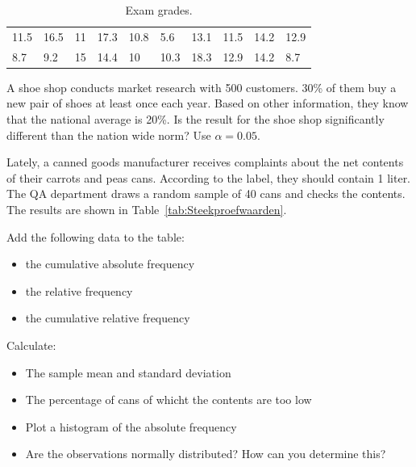 \begin{table}
  \centering
  \begin{tabular}{llllllllll}
    11.5 & 16.5 & 11 & 17.3 & 10.8 & 5.6  & 13.1 & 11.5 & 14.2 & 12.9 \\
    8.7  & 9.2  & 15 & 14.4 & 10   & 10.3 & 18.3 & 12.9 & 14.2 & 8.7 
  \end{tabular}
  \caption{Exam grades.}
  \label{tab:examen}
\end{table}

\begin{exercise}
  A shoe shop conducts market research with 500 customers. 30\% of them buy a new pair of shoes at least once each year. Based on other information, they know that the national average is 20\%. Is the result for the shoe shop significantly different than the nation wide norm? Use $\alpha = 0.05$.
\end{exercise}

\begin{exercise}
  Lately, a canned goods manufacturer receives complaints about the net contents of their carrots and peas cans. According to the label, they should contain 1 liter. The QA department draws a random sample of 40 cans and checks the contents. The results are shown in Table~\ref{tab:Steekproefwaarden}.
  
  Add the following data to the table:
  \begin{itemize}
    \item the cumulative absolute frequency
    \item the relative frequency
    \item the cumulative relative frequency
  \end{itemize}

  Calculate:
  
  \begin{itemize}
    \item The sample mean and standard deviation
    \item The percentage of cans of whicht the contents are too low
    \item Plot a histogram of the absolute frequency
    \item Are the observations normally distributed? How can you determine this?
  \end{itemize}
  
\end{exercise}

